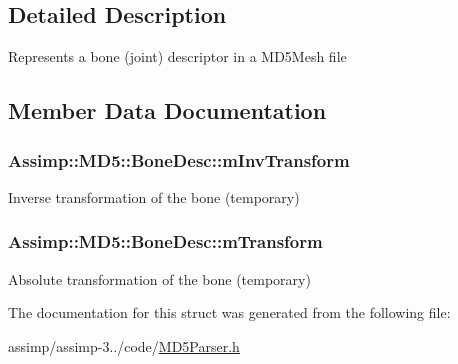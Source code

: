 \subsection{Detailed Description}
Represents a bone (joint) descriptor in a M\+D5\+Mesh file 

\subsection{Member Data Documentation}
\hypertarget{struct_assimp_1_1_m_d5_1_1_bone_desc_af588b49b976d51e1b3083182d1f23e00}{
\subsubsection[{m\+Inv\+Transform}]{ Assimp\+::\+M\+D5\+::\+Bone\+Desc\+::m\+Inv\+Transform}}\label{struct_assimp_1_1_m_d5_1_1_bone_desc_af588b49b976d51e1b3083182d1f23e00}
Inverse transformation of the bone (temporary) \hypertarget{struct_assimp_1_1_m_d5_1_1_bone_desc_a3523c53e8a0025534705a61a4cdb1ea7}{
\subsubsection[{m\+Transform}]{ Assimp\+::\+M\+D5\+::\+Bone\+Desc\+::m\+Transform}}\label{struct_assimp_1_1_m_d5_1_1_bone_desc_a3523c53e8a0025534705a61a4cdb1ea7}
Absolute transformation of the bone (temporary) 

The documentation for this struct was generated from the following file\+:\begin{DoxyCompactItemize}
\item 
assimp/assimp-\/3../code/\hyperlink{_m_d5_parser_8h}{M\+D5\+Parser.\+h}\end{DoxyCompactItemize}
